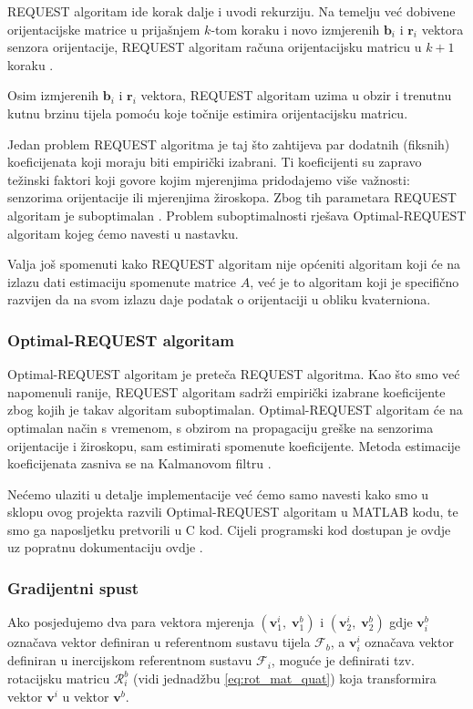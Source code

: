 \documentclass[times, utf8, diplomski, numeric]{templates/template}
\begin{document}
{{{{                REQUEST algoritam ide korak dalje i uvodi rekurziju. Na temelju već dobivene orijentacijske matrice u prijašnjem $k$-tom koraku i novo izmjerenih $\boldsymbol{b}_i$ i $\boldsymbol{r}_i$ vektora senzora orijentacije, REQUEST algoritam računa orijentacijsku matricu u $k+1$ koraku \cite{request_algo}.

                Osim izmjerenih $\boldsymbol{b}_i$ i $\boldsymbol{r}_i$ vektora, REQUEST algoritam uzima u obzir i trenutnu kutnu brzinu tijela pomoću koje točnije estimira orijentacijsku matricu. 

                Jedan problem REQUEST algoritma je taj što zahtijeva par dodatnih (fiksnih) koeficijenata koji moraju biti empirički izabrani. Ti koeficijenti su zapravo težinski faktori koji govore kojim mjerenjima pridodajemo više važnosti: senzorima orijentacije ili mjerenjima žiroskopa. Zbog tih parametara REQUEST algoritam je suboptimalan \cite{opt_req_algo}. Problem suboptimalnosti rješava Optimal-REQUEST algoritam kojeg ćemo navesti u nastavku.

                Valja još spomenuti kako REQUEST algoritam nije općeniti algoritam koji će na izlazu dati estimaciju spomenute matrice $A$, već je to algoritam koji je specifično razvijen da na svom izlazu daje podatak o orijentaciji u obliku kvaterniona.
            }

            \subsubsection{Optimal-REQUEST algoritam}{
                Optimal-REQUEST algoritam je preteča REQUEST algoritma. Kao što smo već napomenuli ranije, REQUEST algoritam sadrži empirički izabrane koeficijente zbog kojih je takav algoritam suboptimalan. Optimal-REQUEST algoritam će na optimalan način s vremenom, s obzirom na propagaciju greške na senzorima orijentacije i žiroskopu, sam estimirati spomenute koeficijente. Metoda estimacije koeficijenata zasniva se na Kalmanovom filtru \cite{opt_req_algo}.

                Nećemo ulaziti u detalje implementacije već ćemo samo navesti kako smo u sklopu ovog projekta razvili Optimal-REQUEST algoritam u MATLAB kodu, te smo ga naposljetku pretvorili u C kod. Cijeli programski kod dostupan je ovdje \cite{opt_req_kod} uz popratnu dokumentaciju ovdje \cite{opt_req_dokumen}. 
            }

            \subsubsection{Gradijentni spust }{
                Ako posjedujemo dva para vektora mjerenja $(\boldsymbol{v}_1^i, \; \boldsymbol{v}_1^b)$ i $(\boldsymbol{v}_2^i, \; \boldsymbol{v}_2^b)$ gdje $\boldsymbol{v}_i^b$ označava vektor definiran u referentnom sustavu tijela $\mathcal{F}_b$, a $\boldsymbol{v}_i^i$ označava vektor definiran u inercijskom referentnom sustavu $\mathcal{F}_i$, moguće je definirati tzv. rotacijsku matricu $\mathcal{R}_i^b$ (vidi jednadžbu \ref{eq:rot_mat_quat}) koja transformira vektor $\boldsymbol{v}^i $ u vektor $\boldsymbol{v}^b$. 

}}}}
\end{document}
